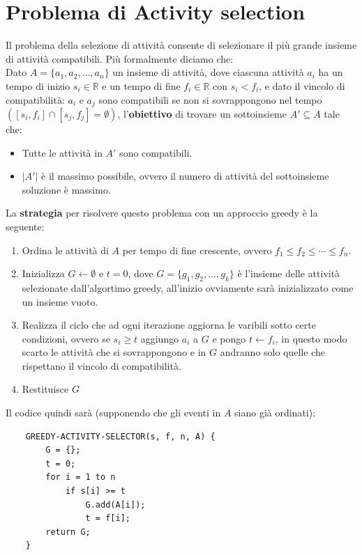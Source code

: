 \section{Problema di Activity selection}
Il problema della selezione di attività consente di selezionare il più grande
insieme di attività compatibili. Più formalmente diciamo che:\\
Dato $A = \{ a_1, a_2,\dots, a_n \}$ un insieme di attività, dove ciascuna attività $a_i$
ha un tempo di inizio $s_i\in \mathbb{R}$ e un tempo di fine $f_i\in\mathbb{R}$
con $s_i< f_i$, e dato il vincolo di compatibilità: $a_i$ e $a_j$ sono compatibili se non si sovrappongono nel tempo
$\left([s_i,f_i]  \cap [s_j,f_j]  = \emptyset     \right)$, l'\textbf{obiettivo} di trovare un sottoinsieme $A' \subseteq A$ tale che:
\begin{itemize}
    \item Tutte le attività in $A'$ sono compatibili.
    \item $|A'|$ è il massimo possibile, ovvero il numero di attività del sottoinsieme soluzione è massimo.
\end{itemize}
La \textbf{strategia} per risolvere questo problema con un approccio greedy è la seguente:
\begin{enumerate}
    \item Ordina le attività di $A$ per tempo di fine crescente, ovvero $f_1 \le f_2 \le \cdots \le f_n$.
    \item Inizializza $G \leftarrow \emptyset$ e $t = 0$, dove $G = \{ g_1,g_2,\dots,g_k  \}$ è l'insieme delle attività selezionate dall'algortimo greedy, all'inizio ovviamente
    sarà inizializzato come un insieme vuoto.
    \item Realizza il ciclo che ad ogni iterazione aggiorna le varibili sotto certe condizioni, ovvero se $s_i \ge t$ aggiungo $a_i$ a $G$ e pongo $t \leftarrow f_i$, in
    questo modo scarto le attività che si sovrappongono e in $G$ andranno solo quelle che rispettano il vincolo di compatibilità.
    \item Restituisce $G$
\end{enumerate}

\noindent Il codice quindi sarà (supponendo che gli eventi in $A$ siano già ordinati):
\begin{verbatim}
    GREEDY-ACTIVITY-SELECTOR(s, f, n, A) {
        G = {};
        t = 0;
        for i = 1 to n
            if s[i] >= t
                G.add(A[i]);
                t = f[i];
        return G;
    }   
\end{verbatim}

